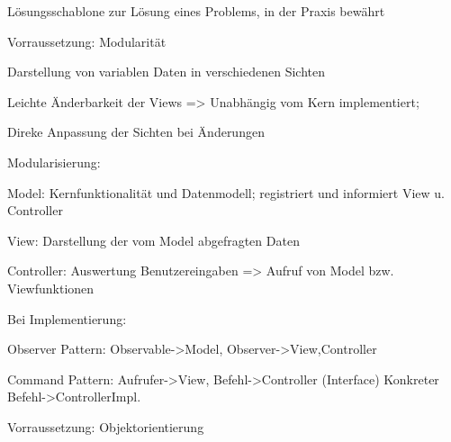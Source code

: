 Lösungsschablone zur Lösung eines Problems, in der Praxis bewährt

Vorraussetzung: Modularität

Darstellung von variablen Daten in verschiedenen Sichten

Leichte Änderbarkeit der Views => Unabhängig vom Kern implementiert;

Direke Anpassung der Sichten bei Änderungen

Modularisierung:

Model: Kernfunktionalität und Datenmodell; registriert und informiert View u. Controller

View: Darstellung der vom Model abgefragten Daten

Controller: Auswertung Benutzereingaben => Aufruf von Model bzw. Viewfunktionen

Bei Implementierung: 

Observer Pattern: Observable->Model, Observer->View,Controller

Command Pattern: Aufrufer->View, Befehl->Controller (Interface) Konkreter Befehl->ControllerImpl.

Vorraussetzung: Objektorientierung



